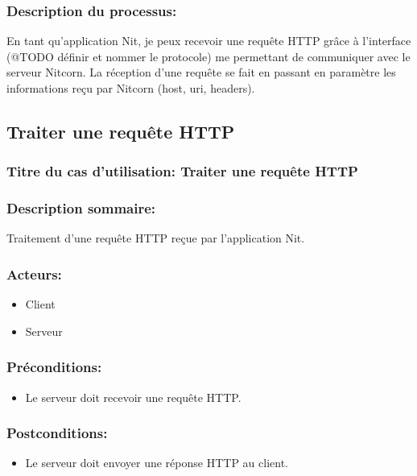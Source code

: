 \documentclass{scrreprt}
\begin{document}
\subsubsection{Description du processus:}
En tant qu'application Nit, je peux recevoir une requête HTTP grâce à l'interface
(@TODO définir et nommer le protocole) me permettant de communiquer avec le serveur
Nitcorn. La réception d'une requête se fait en passant en paramètre les informations
reçu par Nitcorn (host, uri, headers).

\subsection{Traiter une requête HTTP}

\subsubsection{Titre du cas d'utilisation: Traiter une requête HTTP}

\subsubsection{Description sommaire:}
Traitement d'une requête HTTP reçue par l'application Nit.

\subsubsection{Acteurs:}
\begin{itemize}
    \item Client 
    \item Serveur
\end{itemize}

\subsubsection{Préconditions:}
\begin{itemize}
    \item Le serveur doit recevoir une requête HTTP. 
\end{itemize} 

\subsubsection{Postconditions:}
\begin{itemize}
    \item Le serveur doit envoyer une réponse HTTP au client. 
\end{itemize}
 
\end{document}
